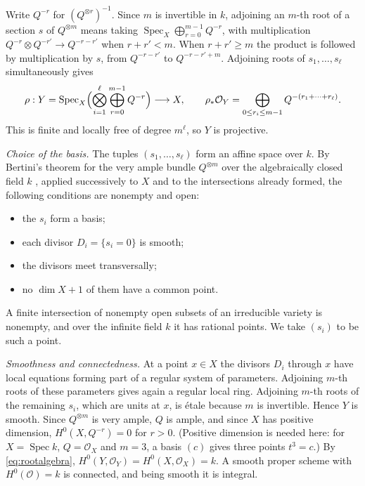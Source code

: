 \documentclass[11pt,a4paper]{article}
\theoremstyle{plain}
\theoremstyle{remark}
\newcommand{\OO}{\mathcal O}
\newcommand{\Spec}{\operatorname{Spec}}
\begin{document}
Write $Q^{-r}$ for $(Q^{\otimes r})^{-1}$. Since $m$ is invertible in $k$, adjoining an $m$-th root of a section $s$ of
$Q^{\otimes m}$ means taking $\Spec_X\bigoplus_{r=0}^{m-1}Q^{-r}$, with multiplication
$Q^{-r}\otimes Q^{-r'}\to Q^{-r-r'}$ when $r+r'<m$. When $r+r'\ge m$ the product is followed by multiplication by $s$,
from $Q^{-r-r'}$ to $Q^{-r-r'+m}$. Adjoining roots of $s_1,\dots,s_\ell$ simultaneously gives
\begin{equation}\label{eq:rootalgebra}
 \rho:Y=\Spec_X\Bigl(\bigotimes_{i=1}^\ell\bigoplus_{r=0}^{m-1}Q^{-r}\Bigr)\longrightarrow X,\qquad
 \rho_*\OO_Y=\bigoplus_{0\le r_i\le m-1}Q^{-(r_1+\cdots+r_\ell)} .
\end{equation}
This is finite and locally free of degree $m^\ell$, so $Y$ is projective.

\emph{Choice of the basis.} The tuples $(s_1,\dots,s_\ell)$ form an affine space over $k$. By Bertini's theorem for the
very ample bundle $Q^{\otimes m}$ over the algebraically closed field $k$ \cite[II.8.18]{Hartshorne}, applied
successively to $X$ and to the intersections already formed, the following conditions are nonempty and open:
\begin{itemize}
\item the $s_i$ form a basis;
\item each divisor $D_i=\{s_i=0\}$ is smooth;
\item the divisors meet transversally;
\item no $\dim X+1$ of them have a common point.
\end{itemize}
A finite intersection of nonempty open subsets of an irreducible variety is nonempty, and over the infinite field $k$
it has rational points. We take $(s_i)$ to be such a point.

\emph{Smoothness and connectedness.} At a point $x\in X$ the divisors $D_i$ through $x$ have local equations forming
part of a regular system of parameters. Adjoining $m$-th roots of these parameters gives again a regular local ring.
Adjoining $m$-th roots of the remaining $s_i$, which are units at $x$, is étale because $m$ is invertible. Hence $Y$ is
smooth. Since $Q^{\otimes m}$ is very ample, $Q$ is ample, and since $X$ has positive dimension,
$H^0(X,Q^{-r})=0$ for $r>0$. (Positive dimension is needed here: for $X=\Spec k$, $Q=\OO_X$ and $m=3$, a basis
$(c)$ gives three points $t^3=c$.) By
\eqref{eq:rootalgebra}, $H^0(Y,\OO_Y)=H^0(X,\OO_X)=k$. A smooth proper scheme with $H^0(\OO)=k$ is connected, and
being smooth it is integral.
\end{document}

